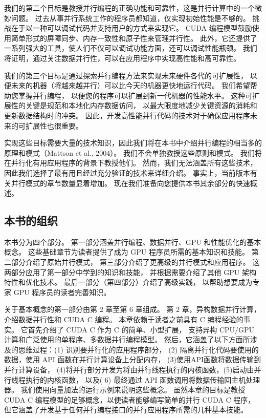 我们的第二个目标是教授并行编程的正确功能和可靠性，这是并行计算中的一个微妙问题。 
过去从事并行系统工作的程序员都知道，仅实现初始性能是不够的。 挑战在于以一种可以调试代码并支持用户的方式来实现它。 
CUDA 编程模型鼓励使用简单形式的屏障同步、内存一致性和原子性来管理并行性。 
此外，它还提供了一系列强大的工具，使人们不仅可以调试功能方面，还可以调试性能瓶颈。 
我们将证明，通过关注数据并行性，可以在应用程序中实现高性能和高可靠性。

我们的第三个目标是通过探索并行编程方法来实现未来硬件各代的可扩展性，
以便未来的机器（将越来越并行）可以比今天的机器更快地运行代码。 我们希望帮助您掌握并行编程，
以便您的程序可以扩展到新一代机器的性能水平。 这种可扩展性的关键是规范和本地化内存数据访问，
以最大限度地减少关键资源的消耗和更新数据结构时的冲突。 
因此，开发高性能并行代码的技术对于确保应用程序未来的可扩展性也很重要。

实现这些目标需要大量的技术知识，因此我们将在本书中介绍并行编程的相当多的原理和模式（Mattson et al., 2004）。 
我们不会单独教授这些原则和模式。 我们将在并行化有用应用程序的背景下教授他们。 
然而，我们无法涵盖所有这些技术，因此我们选择了最有用且经过充分验证的技术来详细介绍。 
事实上，当前版本有关并行模式的章节数量显着增加。 现在我们准备向您提供本书其余部分的快速概述。

\subsection{本书的组织}
本书分为四个部分。 第一部分涵盖并行编程、数据并行、GPU 和性能优化的基本概念。 
这些基础章节为读者提供了成为 GPU 程序员所需的基本知识和技能。 第二部分介绍了原始并行模式，
第三部分介绍了更高级的并行模式和应用程序。 这两部分应用了第一部分中学到的知识和技能，
并根据需要介绍了其他 GPU 架构特性和优化技术。 最后一部分（第四部分）介绍了高级实践，
以帮助想要成为专家 GPU 程序员的读者完善知识。

关于基本概念的第一部分由第 2 章至第 6 章组成。 第 2 章，异构数据并行计算，介绍数据并行性和 CUDA C 编程。 
本章依赖于读者之前具有 C 编程经验的事实。 它首先介绍了 CUDA C 作为 C 的简单、小型扩展，
支持异构 CPU/GPU 计算和广泛使用的单程序、多数据并行编程模型。 
然后，它涵盖了以下方面所涉及的思维过程：(1) 识别要并行化的应用程序部分，
(2) 隔离并行化代码要使用的数据，使用 API 函数在并行计算设备上分配内存， (3)使用API函数将数据传输到并行计算设备，
(4)将并行部分开发为将由并行线程执行的内核函数，(5)启动由并行线程执行的内核函数，
以及( 6) 最终通过 API 函数调用将数据传输回主机处理器。 我们使用向量加法的运行示例来说明这些概念。 
虽然本章的目标是教授 CUDA C 编程模型的足够概念，以便读者能够编写简单的并行 CUDA C 程序，
但它涵盖了开发基于任何并行编程接口的并行应用程序所需的几种基本技能。

